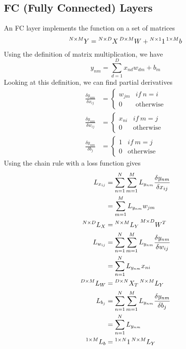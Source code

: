 \documentclass{article}
\numberwithin{equation}{subsection}
\begin{document}
\subsection{FC (Fully Connected) Layers}
An FC layer implements the function on a set of matrices
\begin{equation}
    \prescript{N\times M}{}{Y} = \prescript{N\times D}{}{X}\prescript{D\times M}{}{W} + \prescript{N\times1}{}{1}\prescript{1\times M}{}{b}
\end{equation}
Using the definition of matrix multiplication, we have
\begin{equation}
y_{nm} = \sum_{d=1}^D x_{nd} w_{dm}+b_m
\end{equation}
Looking at this definition, we can find partial derivatives 
\begin{align}
    \frac{\delta y_{nm}}{\delta x_{ij}} &= \begin{cases}
        w_{jm} & if\ n=i\\
        0 & \text{otherwise}
    \end{cases}\\
    \frac{\delta y_{nm}}{\delta w_{ij}} &= \begin{cases}
        x_{ni} & if\ m=j\\
        0 & \text{otherwise}
    \end{cases}\\
    \frac{\delta y_{nm}}{\delta b_{j}} &= \begin{cases}
        1 & if\ m=j\\
        0 & \text{otherwise}
    \end{cases}
\end{align}
Using the chain rule with a loss function gives
\begin{align}
    L_{x_{ij}} &= \sum_{n=1}^N\sum_{m=1}^M L_{y_{nm}} \frac{\delta y_{nm}}{\delta x_{ij}}\\
    &= \sum_{m=1}^M L_{y_{nm}} w_{jm}\\
    \prescript{N\times D}{}{L_X} &= \prescript{N\times M}{}{L_Y}\prescript{M\times D}{}{W^T}\\
    L_{w_{ij}} &= \sum_{n=1}^N\sum_{m=1}^M L_{y_{nm}} \frac{\delta y_{nm}}{\delta w_{ij}}\\
    &= \sum_{n=1}^N L_{y_{nm}} x_{ni}\\
    \prescript{D\times M}{}{L_W} &= \prescript{D\times N}{}{X_T}\prescript{N\times M}{}{L_Y}\\
    L_{b_{j}} &= \sum_{n=1}^N\sum_{m=1}^M L_{y_{nm}} \frac{\delta y_{nm}}{\delta b_{j}}\\
    &= \sum_{n=1}^N L_{y_{nm}}\\
    \prescript{1\times M}{}{L_b} &= \prescript{1\times N}{}{1}\prescript{N\times M}{}{L_Y}
\end{align}
\end{document}
